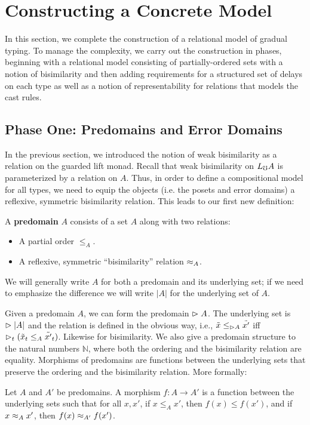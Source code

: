 \section{Constructing a Concrete Model}\label{sec:concrete-model}

In this section, we complete the construction of a relational model of gradual
typing. To manage the complexity, we carry out the construction in phases,
beginning with a relational model consisting of partially-ordered sets with a
notion of bisimilarity and then adding requirements for a structured set of
delays on each type as well as a notion of representability for relations that
models the cast rules.

\subsection{Phase One: Predomains and Error Domains}

In the previous section, we introduced the notion of weak bisimilarity as a
relation on the guarded lift monad. Recall that weak bisimilarity on $L_\mho A$ is
parameterized by a relation on $A$. Thus, in order to define a compositional
model for all types, we need to equip the objects (i.e. the posets and error
domains) a reflexive, symmetric bisimilarity relation. This leads to our first
new definition: 

\begin{definition}
A \textbf{predomain} $A$ consists of a set $A$ along with two relations:
\begin{itemize}
    \item A partial order $\le_A$.
    \item A reflexive, symmetric ``bisimilarity'' relation $\approx_A$.
\end{itemize}
\end{definition}

We will generally write $A$ for both a predomain and its underlying set; if we
need to emphasize the difference we will write $|A|$ for the underlying set of
$A$.

Given a predomain $A$, we can form the predomain $\vartriangleright A$. The underlying set
is $\vartriangleright |A|$ and the relation is defined in the obvious way, i.e., $\tilde{x}
\le_{\vartriangleright A} \tilde{x'}$ iff $\vartriangleright_t(\tilde{x}_t \le_A \tilde{x'}_t)$.
Likewise for bisimilarity.
%
We also give a predomain structure to the natural numbers $\mathbb{N}$, where
both the ordering and the bisimilarity relation are equality.
%
Morphisms of predomains are functions between the underlying sets that preserve
the ordering and the bisimilarity relation. More formally:
%
\begin{definition}
Let $A$ and $A'$ be predomains.
A morphism $f : A \to A'$ is a function between the underlying sets such that for all $x, x'$,
if $x \le_A x'$, then $f(x) \le f(x')$, and if $x \approx_A x'$, then $f(x) \approx_{A'} f(x')$.
\end{definition}

